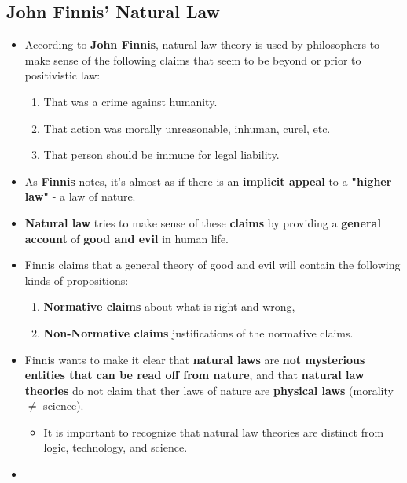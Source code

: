 \documentclass[16pt]{article}
\begin{document}
    \subsection*{John Finnis' Natural Law}
    \begin{itemize}
        \item According to \textbf{John Finnis}, natural law theory is used by philosophers to make sense of the following claims that seem to be beyond or prior to positivistic law:
        \begin{enumerate}
            \item That was a crime against humanity.
            \item That action was morally unreasonable, inhuman, curel, etc.
            \item That person should be immune for legal liability.
        \end{enumerate}
        \item As \textbf{Finnis} notes, it's almost as if there is an \textbf{implicit appeal} to a \textbf{"higher law"} - a law of nature.
        \item \textbf{Natural law} tries to make sense of these \textbf{claims} by providing a \textbf{general account} of \textbf{good and evil} in human life.
        \item Finnis claims that a general theory of good and evil will contain the following kinds of propositions:
        \begin{enumerate}
            \item \textbf{Normative claims} about what is right and wrong,
            \item \textbf{Non-Normative claims} justifications of the normative claims. 
        \end{enumerate}
        \item Finnis wants to make it clear that \textbf{natural laws} are \textbf{not mysterious entities that can be read off from nature}, and that \textbf{natural law theories} do not claim that ther laws of nature are \textbf{physical laws} (morality $\ne$ science).
        \begin{itemize}
            \item It is important to recognize that natural law theories are distinct from logic, technology, and science.
        \end{itemize}
        \item 
    \end{itemize}
\end{document}
